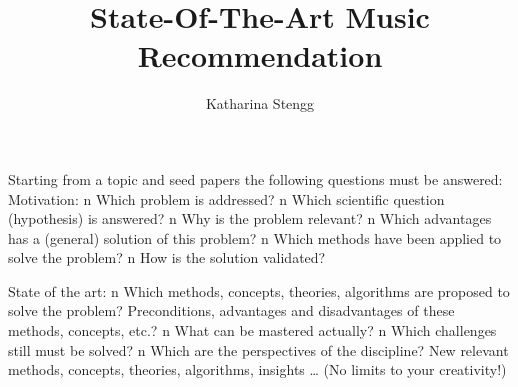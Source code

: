 \documentclass[runningheads,a4paper]{llncs}
\begin{document}
\mainmatter  %

\title{State-Of-The-Art Music Recommendation}


%
%
\author{Katharina Stengg}%
%

%
%

\maketitle

Starting from a topic and seed papers the following
questions must be answered:
Motivation:
n Which problem is addressed?
n Which scientific question (hypothesis) is answered?
n Why is the problem relevant?
n Which advantages has a (general) solution of this problem?
n Which methods have been applied to solve the problem?
n How is the solution validated?


State of the art:
n Which methods, concepts, theories, algorithms are proposed to solve the
problem? Preconditions, advantages and disadvantages of these
methods, concepts, etc.?
n What can be mastered actually?
n Which challenges still must be solved?
n Which are the perspectives of the discipline?
New relevant methods, concepts, theories, algorithms, insights …
(No limits to your creativity!)
\end{document}
